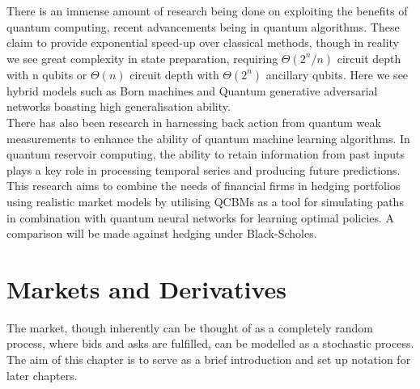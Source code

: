 \documentclass[12pt]{article}
\numberwithin{equation}{section}
\begin{document}
There is an immense amount of research being done on exploiting the benefits of 
quantum computing, recent advancements being in quantum algorithms. 
These claim to provide exponential speed-up over classical 
methods, though in reality we see great complexity in state preparation, requiring 
$\Theta(2^n/n)$ circuit depth with n qubits or $\Theta(n)$ circuit depth with 
$\Theta(2^n)$ ancillary qubits. Here we see hybrid models such as Born machines
and Quantum generative adversarial networks boasting high generalisation ability.
\autocite{do quantum circuits generalise}
\\
There has also been research in harnessing back action from quantum weak 
measurements to enhance the ability of quantum machine learning algorithms. 
In quantum reservoir computing,
the ability to retain information from past inputs plays a key role in processing 
temporal series and producing future predictions.\autocite{fujii_quantum_2020}  
\\
This research aims to combine the needs of financial firms in hedging portfolios
using realistic market models by utilising QCBMs as a tool 
for simulating paths in combination with quantum neural networks for learning 
optimal policies. A comparison will be made against hedging under Black-Scholes.


\clearpage
\section{Markets and Derivatives}
The market, though inherently can be thought of as a completely random process,
where bids and asks are fulfilled, can be modelled as a stochastic process. The 
aim of this chapter is to serve as a brief introduction and set up notation for 
later chapters. \\
\end{document}
